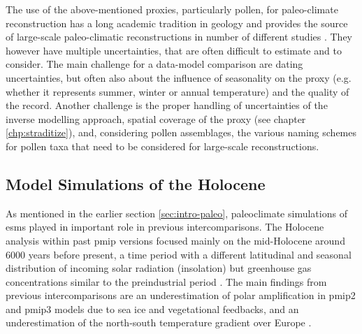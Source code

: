\begin{refsection}
The use of the above-mentioned proxies, particularly pollen, for paleo-climate reconstruction has a long academic tradition in geology \citep{Bradley1985} and provides the source of large-scale paleo-climatic reconstructions in number of different studies \citep{MauriDavisCollinsEtAl2015, DavisBrewerStevensonEtAl2003, MarsicekShumanBartleinEtAl2018, NeukomSteigerGomezNavarroEtAl2019, NeukomBarbozaErbEtAl2019}. They however have multiple uncertainties, that are often difficult to estimate and to consider. The main challenge for a data-model comparison are dating uncertainties, but often also about the influence of seasonality on the proxy (e.g. whether it represents summer, winter or annual temperature) and the quality of the record. Another challenge is the proper handling of uncertainties of the inverse modelling approach, spatial coverage of the proxy (see chapter \ref{chp:straditize}), and, considering pollen assemblages, the various naming schemes for pollen taxa that need to be considered for large-scale reconstructions.


\subsection{Model Simulations of the Holocene}  \label{sec:intro-paleo-model}
As mentioned in the earlier section \ref{sec:intro-paleo}, paleoclimate simulations of \glspl{esm} played in important role in previous intercomparisons. The Holocene analysis within past \gls{pmip} versions focused mainly on the mid-Holocene around 6000 years before present, a time period with a different latitudinal and seasonal distribution of incoming solar radiation (insolation) but greenhouse gas concentrations similar to the preindustrial period \citep{Otto-BliesnerBraconnotHarrisonEtAl2017}. The main findings from previous intercomparisons are an underestimation of polar amplification in \gls{pmip}2 and \gls{pmip}3 models due to sea ice and vegetational feedbacks, and an underestimation of the north-south temperature gradient over Europe \citep{ClimateChange2014a, MassonDelmotteKageyamaBraconnotEtAl2006, ZhangSundqvistMobergEtAl2010, BrewerGuiotTorre2007, DavisBrewer2009}.


\end{refsection}
